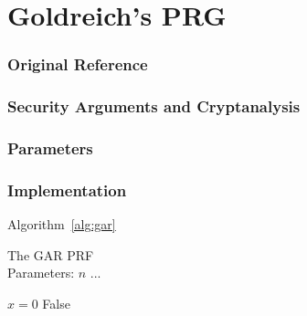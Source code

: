 \section{Goldreich's PRG}
\label{sec:goldreich}


\subsubsection*{Original Reference}

\subsubsection*{Security Arguments and Cryptanalysis}


\subsubsection*{Parameters}


\subsubsection*{Implementation}

Algorithm~\ref{alg:gar}

\begin{algorithm}
  \caption{\label{alg:gar}The GAR PRF \\
    Parameters: $n$ ...}
  \begin{algorithmic}
    \State $x = 0$
    \Return False
  \end{algorithmic}
\end{algorithm}




